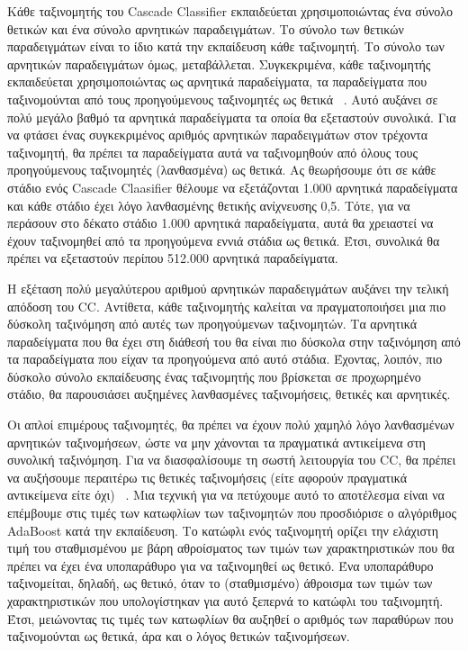 Κάθε ταξινομητής του Cascade Classifier εκπαιδεύεται χρησιμοποιώντας ένα σύνολο θετικών και ένα
σύνολο αρνητικών παραδειγμάτων. Το σύνολο των θετικών παραδειγμάτων είναι το ίδιο
κατά την εκπαίδευση κάθε ταξινομητή. Το σύνολο των αρνητικών παραδειγμάτων όμως,
μεταβάλλεται. Συγκεκριμένα, κάθε ταξινομητής εκπαιδεύεται χρησιμοποιώντας ως
αρνητικά παραδείγματα, τα παραδείγματα που ταξινομούνται από τους προηγούμενους ταξινομητές
ως θετικά ~\cite{Viola01rapidobject}. Αυτό αυξάνει σε πολύ μεγάλο βαθμό τα
αρνητικά παραδείγματα τα οποία θα εξεταστούν συνολικά. Για να φτάσει ένας συγκεκριμένος
αριθμός αρνητικών παραδειγμάτων στον τρέχοντα ταξινομητή, θα πρέπει τα παραδείγματα αυτά
να ταξινομηθούν από όλους τους προηγούμενους ταξινομητές (λανθασμένα) ως θετικά.
Ας θεωρήσουμε ότι σε κάθε στάδιο ενός Cascade Claasifier θέλουμε να εξετάζονται 1.000 αρνητικά
παραδείγματα και κάθε στάδιο έχει λόγο λανθασμένης θετικής ανίχνευσης 0,5. Τότε, για να
περάσουν στο δέκατο στάδιο 1.000 αρνητικά παραδείγματα, αυτά θα χρειαστεί να έχουν
ταξινομηθεί από τα προηγούμενα εννιά στάδια ως θετικά. Έτσι, συνολικά θα πρέπει να εξεταστούν
περίπου 512.000 αρνητικά παραδείγματα.

Η εξέταση πολύ μεγαλύτερου αριθμού αρνητικών παραδειγμάτων αυξάνει την τελική απόδοση
του CC. Αντίθετα, κάθε ταξινομητής καλείται να πραγματοποιήσει μια πιο δύσκολη ταξινόμηση
από αυτές των προηγούμενων ταξινομητών. Τα αρνητικά παραδείγματα που θα έχει στη διάθεσή
του θα είναι πιο δύσκολα στην ταξινόμηση από τα παραδείγματα που είχαν τα προηγούμενα από
αυτό στάδια. Έχοντας, λοιπόν, πιο δύσκολο σύνολο εκπαίδευσης ένας ταξινομητής που βρίσκεται
σε προχωρημένο στάδιο, θα παρουσιάσει αυξημένες λανθασμένες ταξινομήσεις, θετικές και
αρνητικές.

Οι απλοί επιμέρους ταξινομητές, θα πρέπει να έχουν πολύ χαμηλό λόγο λανθασμένων
αρνητικών ταξινομήσεων, ώστε να μην χάνονται τα πραγματικά αντικείμενα στη συνολική
ταξινόμηση. Για να διασφαλίσουμε τη σωστή λειτουργία του CC, θα πρέπει να αυξήσουμε
περαιτέρω τις θετικές ταξινομήσεις (είτε αφορούν πραγματικά αντικείμενα είτε όχι)
~\cite{Viola01rapidobject}. Μια τεχνική για να πετύχουμε αυτό το αποτέλεσμα είναι
να επέμβουμε στις τιμές των κατωφλίων των ταξινομητών που προσδιόρισε ο αλγόριθμος
AdaBoost κατά την εκπαίδευση. Το κατώφλι ενός ταξινομητή ορίζει την ελάχιστη τιμή
του σταθμισμένου με βάρη αθροίσματος των τιμών των χαρακτηριστικών που θα πρέπει
να έχει ένα υποπαράθυρο για να ταξινομηθεί ως θετικό. Ένα υποπαράθυρο ταξινομείται,
δηλαδή, ως θετικό, όταν το (σταθμισμένο) άθροισμα των τιμών των χαρακτηριστικών που
υπολογίστηκαν για αυτό ξεπερνά το κατώφλι του ταξινομητή. Έτσι, μειώνοντας τις
τιμές των κατωφλίων θα αυξηθεί ο αριθμός των παραθύρων που ταξινομούνται ως
θετικά, άρα και ο λόγος θετικών ταξινομήσεων.

